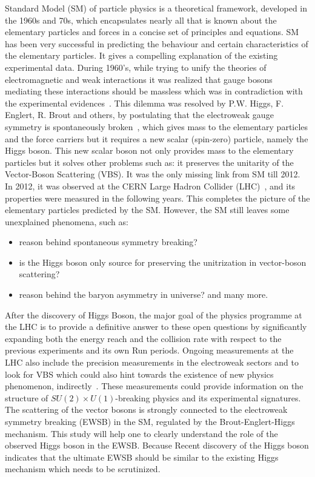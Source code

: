 Standard Model (SM) of particle physics is a theoretical framework, developed in the 1960s and 70s, which encapsulates nearly all that is known about the elementary particles and forces in a concise set of principles and equations. SM has been very successful in predicting the behaviour and certain characteristics of the elementary particles. It gives a compelling explanation of the existing experimental data. During 1960’s, while trying to unify the theories of electromagnetic and weak interactions it was realized that gauge bosons mediating these interactions should be massless which was in contradiction with the  experimental evidences~\cite{StandardModel67_1,StandardModel67_2,StandardModel67_3,}. This dilemma was resolved by P.W. Higgs, F. Englert, R. Brout  and others, by postulating that  the electroweak gauge symmetry is spontaneously broken~\cite{Englert1964,Higgs1964,Higgs1964a,Guralnik1964,Higgs1966,Kibble1967}, which gives mass to the elementary particles and the force carriers but it requires  a new scalar (spin-zero) particle, namely the Higgs boson. This new scalar boson not only provides mass to the elementary particles but it solves other problems such as: it preserves the unitarity of the Vector-Boson Scattering (VBS). It was the only missing link from SM till 2012. In 2012, it was observed at the CERN Large Hadron Collider (LHC)~\cite{Chatrchyan:2012xdj,Aad:2012tfa}, and its properties were measured in the following years. This completes the picture of the elementary particles predicted by the SM. However, the SM still leaves some unexplained phenomena, such as: 
\begin{itemize}
    \item reason behind spontaneous symmetry breaking?
    \item is the Higgs boson only source for preserving the unitrization in vector-boson scattering? 
    \item reason behind the baryon asymmetry in universe? and many more.
\end{itemize}
After the discovery of Higgs Boson, the major goal of the physics programme at the LHC is to provide a definitive answer to these open questions by significantly expanding both the energy reach and the collision rate with respect to the previous experiments and its own Run periods.
Ongoing measurements at the LHC also include the precision measurements in the electroweak sectors and to look for VBS which could also hint towards the existence of new physics phenomenon, indirectly~\cite{Baak2013}. These measurements could provide information on the structure of $SU(2) \times U(1)$-breaking physics and its experimental signatures. 
The scattering of the vector bosons is strongly connected to the electroweak symmetry breaking (EWSB) in the SM, regulated by the Brout-Englert-Higgs mechanism. This study will help one to clearly understand the role of the observed Higgs boson in the EWSB. Because Recent discovery of the Higgs boson indicates that the ultimate EWSB should be similar to the existing Higgs mechanism which needs to be scrutinized.


